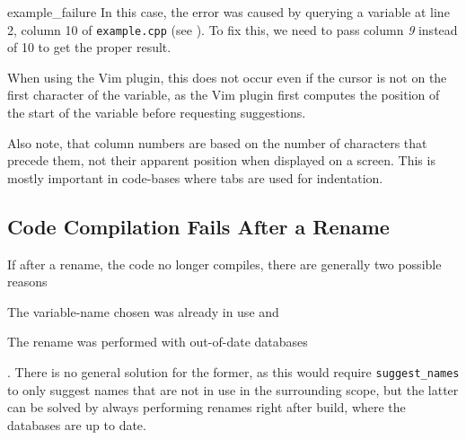 
		{example_failure}
In this case, the error was caused by querying a variable at line 2, column 10
of \lstinline|example.cpp| (see ). To fix this, we need to
pass column \emph{9} instead of 10 to get the proper result.

When using the Vim plugin, this does not occur even if the cursor is not on the
first character of the variable, as the Vim plugin first computes the position
of the start of the variable before requesting suggestions.

Also note, that column numbers are based on the number of characters that
precede them, not their apparent position when displayed on a screen. This is
mostly important in code-bases where tabs are used for indentation.

\subsection{Code Compilation Fails After a Rename}
If after a rename, the code no longer compiles, there are generally two possible
reasons \begin{inparaenum}\item The variable-name chosen
was already in use and \item The rename was performed with out-of-date
databases\end{inparaenum}.
There is no general solution for the former, as this would require
\lstinline|suggest_names| to only suggest names that are not in use in the
surrounding scope, but the latter can be solved by always performing renames
right after build, where the databases are up to date.
